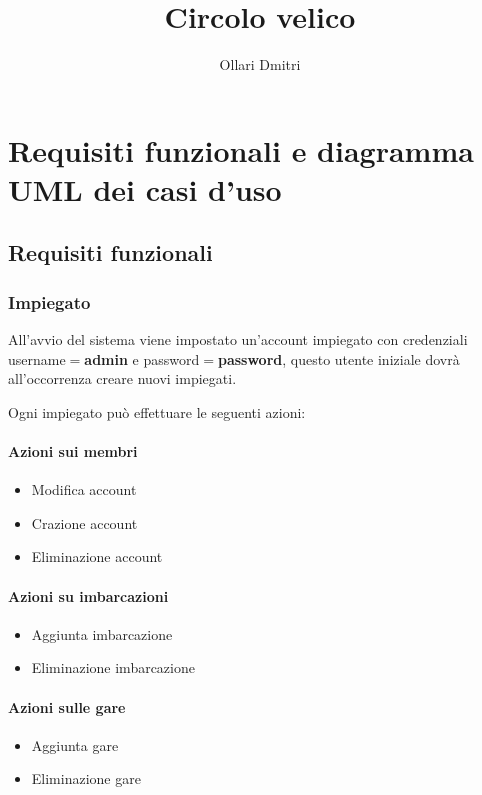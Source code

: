 \documentclass{report}
\title{Circolo velico}
\author{Ollari Dmitri}
\begin{document}
    \maketitle
    

    \tableofcontents
    \listoffigures

    \chapter{Requisiti funzionali e diagramma UML dei casi d'uso} %
    \label{cha:Requisiti funzionali e diagramma UML dei casi d'uso}
    \section{Requisiti funzionali} %
    \label{sec:Requisiti funzionali}

    \subsection{Impiegato}
    All'avvio del sistema viene impostato un'account impiegato con credenziali username$=$\textbf{admin} e password$=$\textbf{password}, questo utente iniziale dovrà all'occorrenza creare nuovi impiegati.

    Ogni impiegato può effettuare le seguenti azioni:
    \subsubsection{Azioni sui membri}
    \begin{itemize}
      \item Modifica account
      \item Crazione account
      \item Eliminazione account
    \end{itemize}

    \subsubsection{Azioni su imbarcazioni}
    \begin{itemize}
      \item Aggiunta imbarcazione
      \item Eliminazione imbarcazione
    \end{itemize}

    \subsubsection{Azioni sulle gare}
    \begin{itemize}
      \item Aggiunta gare
      \item Eliminazione gare
    \end{itemize}
\end{document}
